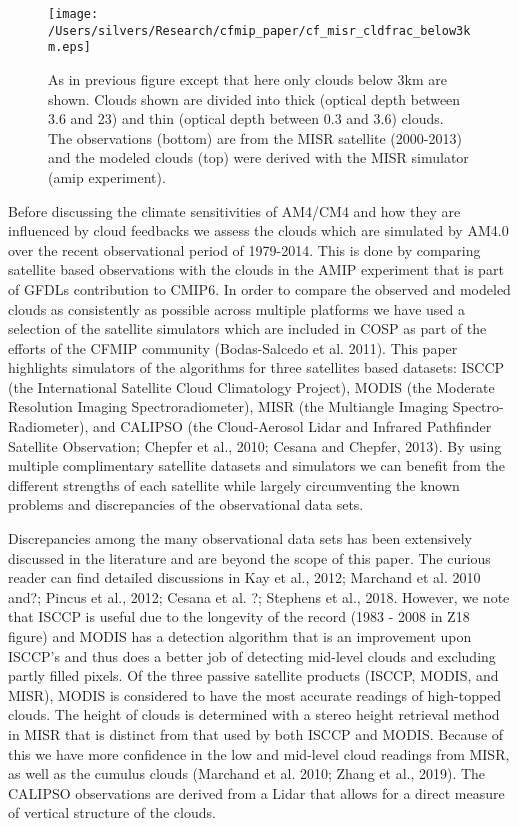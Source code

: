\documentclass[11pt]{article}   	%
\begin{document}
\begin{figure}
  \texttt{[image: /Users/silvers/Research/cfmip\_paper/cf\_misr\_cldfrac\_below3km.eps]}
  \caption{As in previous figure except that here only clouds below 3km are shown.  Clouds shown are divided into thick 
  (optical depth between 3.6 and 23) and thin (optical depth between 0.3 and 3.6) 
  clouds.  The observations (bottom) are from the MISR satellite (2000-2013) and the modeled clouds (top) were derived 
  with the MISR simulator (amip experiment).}
  \label{fig:calipso_sim_vs_mod}
\end{figure}

Before discussing the climate sensitivities of AM4/CM4 and how they are influenced by cloud feedbacks we assess
the clouds which are simulated by AM4.0 over the recent observational period of 1979-2014.  This is done by comparing
satellite based observations with the clouds in the AMIP experiment that is part of GFDLs contribution to CMIP6.  In 
order to compare the observed and modeled clouds as consistently as possible across multiple platforms we have 
used a selection of the satellite simulators which are included in COSP as part of the efforts of the CFMIP community 
(Bodas-Salcedo et al. 2011).  This paper highlights simulators of the algorithms for three satellites based datasets: 
ISCCP (the International Satellite Cloud Climatology Project), MODIS (the Moderate Resolution Imaging Spectroradiometer), 
MISR (the Multiangle Imaging Spectro-Radiometer), and CALIPSO (the Cloud-Aerosol Lidar and Infrared Pathfinder 
Satellite Observation; Chepfer et al., 2010; Cesana and Chepfer, 2013).  By using multiple complimentary satellite 
datasets and simulators we can benefit from 
the different strengths of each satellite while largely circumventing the known problems and discrepancies of the 
observational data sets.      

Discrepancies among the many observational data sets has been extensively discussed in the literature and are 
beyond the scope of this paper.  The curious reader can find detailed discussions in Kay et al., 2012; 
Marchand et al. 2010 and?; Pincus et al., 2012; Cesana et al. ?; Stephens et al., 2018.  However, we note that ISCCP is useful due to 
the longevity of the record (1983 - 2008 in Z18 figure) and MODIS has a detection algorithm that is an improvement upon ISCCP's and
thus does a better job of detecting mid-level clouds and excluding partly filled pixels.   Of the three passive satellite products 
(ISCCP, MODIS, and MISR), MODIS is considered to have the most accurate readings of high-topped clouds.  
The height of clouds is determined with a stereo height retrieval method in MISR that is distinct from that used by
both ISCCP and MODIS.  Because of this we have more confidence in the low and mid-level cloud readings 
from MISR, as well as the cumulus clouds (Marchand et al. 2010; Zhang et al., 2019).   The CALIPSO observations
are derived from a Lidar that allows for a direct measure of vertical structure of the clouds.  
\end{document}
